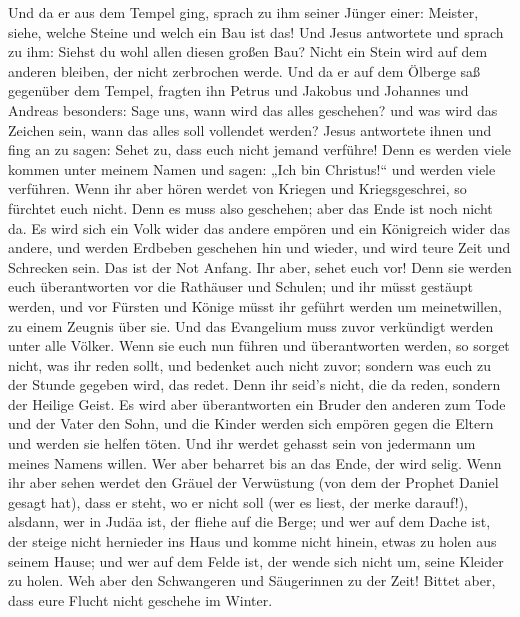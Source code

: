  Und da er aus dem Tempel ging, sprach zu ihm seiner
Jünger einer: Meister, siehe, welche Steine und welch ein Bau ist das!
 Und Jesus antwortete und sprach zu ihm: Siehst du wohl
allen diesen großen Bau? Nicht ein Stein wird auf dem anderen bleiben,
der nicht zerbrochen werde.  Und da er auf dem Ölberge saß
gegenüber dem Tempel, fragten ihn Petrus und Jakobus und Johannes und
Andreas besonders:  Sage uns, wann wird das alles
geschehen? und was wird das Zeichen sein, wann das alles soll vollendet
werden?  Jesus antwortete ihnen und fing an zu sagen:
Sehet zu, dass euch nicht jemand verführe!  Denn es werden
viele kommen unter meinem Namen und sagen: „Ich bin Christus!{}`` und
werden viele verführen.  Wenn ihr aber hören werdet von
Kriegen und Kriegsgeschrei, so fürchtet euch nicht. Denn es muss also
geschehen; aber das Ende ist noch nicht da.  Es wird sich
ein Volk wider das andere empören und ein Königreich wider das andere,
und werden Erdbeben geschehen hin und wieder, und wird teure Zeit und
Schrecken sein. Das ist der Not Anfang.  Ihr aber, sehet
euch vor! Denn sie werden euch überantworten vor die Rathäuser und
Schulen; und ihr müsst gestäupt werden, und vor Fürsten und Könige müsst
ihr geführt werden um meinetwillen, zu einem Zeugnis über sie.
 Und das Evangelium muss zuvor verkündigt werden unter
alle Völker.  Wenn sie euch nun führen und überantworten
werden, so sorget nicht, was ihr reden sollt, und bedenket auch nicht
zuvor; sondern was euch zu der Stunde gegeben wird, das redet. Denn ihr
seid's nicht, die da reden, sondern der Heilige Geist. 
Es wird aber überantworten ein Bruder den anderen zum Tode und der Vater
den Sohn, und die Kinder werden sich empören gegen die Eltern und werden
sie helfen töten.  Und ihr werdet gehasst sein von
jedermann um meines Namens willen. Wer aber beharret bis an das Ende,
der wird selig.  Wenn ihr aber sehen werdet den Gräuel
der Verwüstung (von dem der Prophet Daniel gesagt hat), dass er steht,
wo er nicht soll (wer es liest, der merke darauf!), alsdann, wer in
Judäa ist, der fliehe auf die Berge;  und wer auf dem
Dache ist, der steige nicht hernieder ins Haus und komme nicht hinein,
etwas zu holen aus seinem Hause;  und wer auf dem Felde
ist, der wende sich nicht um, seine Kleider zu holen. 
Weh aber den Schwangeren und Säugerinnen zu der Zeit! 
Bittet aber, dass eure Flucht nicht geschehe im Winter. 
